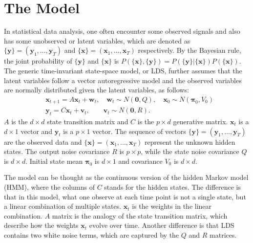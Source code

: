 \documentclass[fleqn]{article}
\begin{document}
\section{The Model}
In statistical data analysis, one often encounter some observed signals and also has some unobserved or latent variables, which are denoted as $\{\mathbf{y}\}=(\mathbf{y}_1,\ldots,\mathbf{y}_T)$ and $\{\mathbf{x}\}=(\mathbf{x}_1,\ldots,\mathbf{x}_T)$ respectively. By the Bayesian rule, the joint probability of $\{\mathbf{y}\}$ and $\{\mathbf{x}\}$ is $P(\{\mathbf{x}\},\{\mathbf{y}\})=P(\{\mathbf{y}\}|\{\mathbf{x}\}) P(\{\mathbf{x}\})$. The generic time-invariant state-space model, or LDS, further assumes that the latent variables follow a vector autoregressive model and the observed variables are normally distributed given the latent variables, as follows:
\begin{equation} \label{eq:model}
\begin{aligned}
&\mathbf{x}_{t+1}=A\mathbf{x}_t+\mathbf{w}_t, \quad \mathbf{w}_t\sim N(\mathbf{0},Q),\quad \mathbf{x}_0 \sim N(\mathbf{\pi}_0,V_0)\\
&\mathbf{y}_t=C\mathbf{x}_t+\mathbf{v}_t,\qquad \mathbf{v}_t\sim N(\mathbf{0},R).
\end{aligned}
\end{equation}
$A$ is the $d\times d$ state transition matrix and $C$ is the $p \times d$ generative matrix. $\mathbf{x}_t$ is a $d\times 1$ vector and $\mathbf{y}_t$ is a $p\times 1$ vector. The sequence of vectors $\{\mathbf{y}\}=(\mathbf{y}_1,\ldots,\mathbf{y}_T)$ are the observed data and $\{\mathbf{x}\}=(\mathbf{x}_1,\ldots,\mathbf{x}_T)$ represent the unknown hidden states. The output noise covariance $R$ is $p\times p$, while the state noise covariance $Q$ is $d\times d$. Initial state mean $\mathbf{\pi}_0$ is $d\times 1$ and covariance $V_0$ is $d \times d$.

The model can be thought as the continuous version of the hidden Markov model (HMM), where the columns of $C$ stands for the hidden states. The difference is that in this model, what one observe at each time point is not a single state, but a linear combination of multiple states. $\mathbf{x}_t$ is the weights in the linear combination. $A$ matrix is the analogy of the state transition matrix, which describe how the weights $\mathbf{x}_t$ evolve over time. Another difference is that LDS contains two white noise terms, which are captured by the $Q$ and $R$ matrices.
\end{document}
